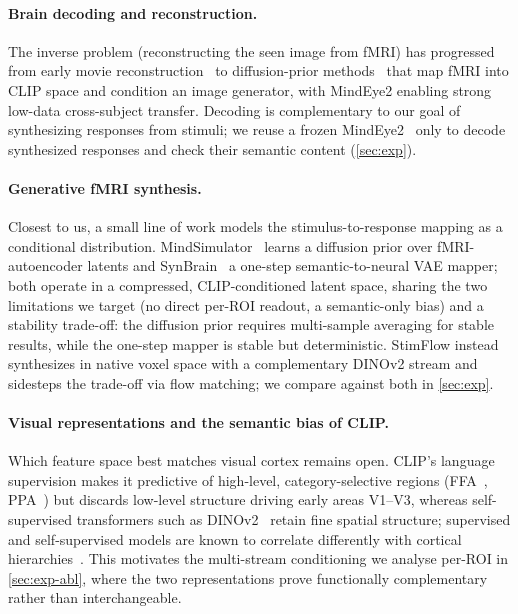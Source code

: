 \documentclass[runningheads]{llncs}
\begin{document}
\paragraph{Brain decoding and reconstruction.}
The inverse problem (reconstructing the seen image from fMRI) has progressed from early movie
reconstruction~\cite{Nishimoto2011} to diffusion-prior
methods~\cite{takagi2023,mindeye,mindeye2} that map fMRI into CLIP space and condition an image
generator, with MindEye2 enabling strong low-data cross-subject transfer. Decoding is
complementary to our goal of synthesizing responses from stimuli; we reuse a frozen
MindEye2~\cite{mindeye2} only to decode synthesized responses and check their semantic content
(\cref{sec:exp}).

\paragraph{Generative fMRI synthesis.}
Closest to us, a small line of work models the stimulus-to-response mapping as a conditional
distribution. MindSimulator~\cite{mindsimulator} learns a diffusion prior over fMRI-autoencoder
latents and SynBrain~\cite{synbrain} a one-step semantic-to-neural VAE mapper; both operate in
a compressed, CLIP-conditioned latent space, sharing the two limitations we target (no direct
per-ROI readout, a semantic-only bias) and a stability trade-off: the diffusion prior
requires multi-sample averaging for stable results, while the one-step mapper is stable but
deterministic. StimFlow instead synthesizes in native voxel space with a complementary DINOv2
stream and sidesteps the trade-off via flow matching; we compare against both in \cref{sec:exp}.

\paragraph{Visual representations and the semantic bias of CLIP.}
Which feature space best matches visual cortex remains open. CLIP's language supervision makes
it predictive of high-level, category-selective regions (FFA~\cite{kanwisher1997ffa},
PPA~\cite{epstein1998ppa}) but discards low-level structure driving early areas V1--V3, whereas
self-supervised transformers such as DINOv2~\cite{dinov2,dosovitskiy2021image} retain fine
spatial structure; supervised and self-supervised models are known to correlate differently
with cortical hierarchies~\cite{Khaligh-Razavi2014,chen2020simclr,He_2022_CVPR}. This motivates
the multi-stream conditioning we analyse per-ROI in \cref{sec:exp-abl}, where the two
representations prove functionally complementary rather than interchangeable.
\end{document}
